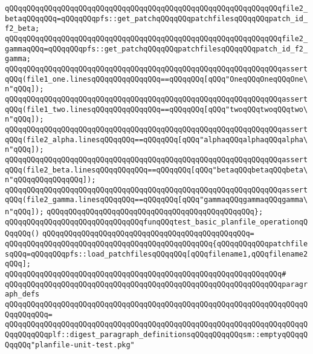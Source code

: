 \verb|qQQqqQQqqQQqqQQqqQQqqQQqqQQqqQQqqQQqqQQqqQQqqQQqqQQqqQQqqQQqqQQqfile2_betaqQQqqQQq=qQQqqQQqpfs::get_patchqQQqqQQqpatchfilesqQQqqQQqpatch_id_f2_beta;|\newline
\verb|qQQqqQQqqQQqqQQqqQQqqQQqqQQqqQQqqQQqqQQqqQQqqQQqqQQqqQQqqQQqqQQqfile2_gammaqQQq=qQQqqQQqpfs::get_patchqQQqqQQqpatchfilesqQQqqQQqpatch_id_f2_gamma;|\newline
\newline
\verb|qQQqqQQqqQQqqQQqqQQqqQQqqQQqqQQqqQQqqQQqqQQqqQQqqQQqqQQqqQQqqQQqassertqQQq(file1_one.linesqQQqqQQqqQQqqQQq==qQQqqQQq[qQQq"OneqQQqOneqQQqOne\n"qQQq]);|\newline
\verb|qQQqqQQqqQQqqQQqqQQqqQQqqQQqqQQqqQQqqQQqqQQqqQQqqQQqqQQqqQQqqQQqassertqQQq(file1_two.linesqQQqqQQqqQQqqQQq==qQQqqQQq[qQQq"twoqQQqtwoqQQqtwo\n"qQQq]);|\newline
\newline
\verb|qQQqqQQqqQQqqQQqqQQqqQQqqQQqqQQqqQQqqQQqqQQqqQQqqQQqqQQqqQQqqQQqassertqQQq(file2_alpha.linesqQQqqQQq==qQQqqQQq[qQQq"alphaqQQqalphaqQQqalpha\n"qQQq]);|\newline
\verb|qQQqqQQqqQQqqQQqqQQqqQQqqQQqqQQqqQQqqQQqqQQqqQQqqQQqqQQqqQQqqQQqassertqQQq(file2_beta.linesqQQqqQQqqQQq==qQQqqQQq[qQQq"betaqQQqbetaqQQqbeta\n"qQQqqQQqqQQqqQQq]);|\newline
\verb|qQQqqQQqqQQqqQQqqQQqqQQqqQQqqQQqqQQqqQQqqQQqqQQqqQQqqQQqqQQqqQQqassertqQQq(file2_gamma.linesqQQqqQQq==qQQqqQQq[qQQq"gammaqQQqgammaqQQqgamma\n"qQQq]);|\newline
\verb|qQQqqQQqqQQqqQQqqQQqqQQqqQQqqQQqqQQqqQQqqQQqqQQq};|\newline
\newline
\verb|qQQqqQQqqQQqqQQqqQQqqQQqqQQqqQQqfunqQQqtest_basic_planfile_operationqQQqqQQq()|\newline
\verb|qQQqqQQqqQQqqQQqqQQqqQQqqQQqqQQqqQQqqQQqqQQqqQQq=|\newline
\verb|qQQqqQQqqQQqqQQqqQQqqQQqqQQqqQQqqQQqqQQqqQQqqQQq{qQQqqQQqqQQqpatchfilesqQQq=qQQqqQQqpfs::load_patchfilesqQQqqQQq[qQQqfilename1,qQQqfilename2qQQq];|\newline
\verb|qQQqqQQqqQQqqQQqqQQqqQQqqQQqqQQqqQQqqQQqqQQqqQQqqQQqqQQqqQQqqQQq#|\newline
\newline
\verb|qQQqqQQqqQQqqQQqqQQqqQQqqQQqqQQqqQQqqQQqqQQqqQQqqQQqqQQqqQQqqQQqparagraph_defs|\newline
\verb|qQQqqQQqqQQqqQQqqQQqqQQqqQQqqQQqqQQqqQQqqQQqqQQqqQQqqQQqqQQqqQQqqQQqqQQqqQQqqQQq=|\newline
\verb|qQQqqQQqqQQqqQQqqQQqqQQqqQQqqQQqqQQqqQQqqQQqqQQqqQQqqQQqqQQqqQQqqQQqqQQqqQQqqQQqplf::digest_paragraph_definitionsqQQqqQQqqQQqsm::emptyqQQqqQQqqQQq"planfile-unit-test.pkg"|\newline
